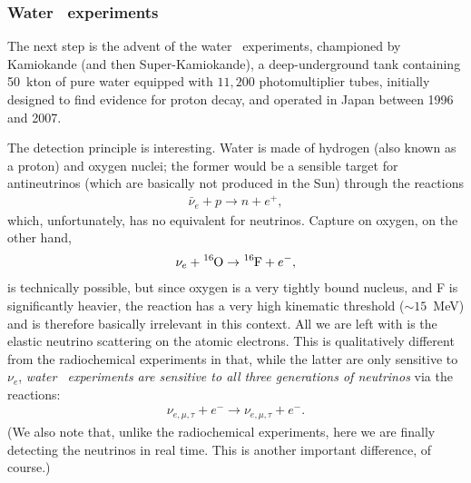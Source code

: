 \subsubsection{Water \cherenkov\ experiments}

The next step is the advent of the water \cherenkov\ experiments, championed by
Kamiokande (and then Super-Kamiokande), a deep-underground tank containing 50~kton of
pure water equipped with $11,200$ photomultiplier tubes, initially designed to find
evidence for proton decay, and operated in Japan between 1996 and 2007.

The detection principle is interesting. Water is made of hydrogen (also known as
a proton) and oxygen nuclei; the former would be a sensible target for antineutrinos
(which are basically not produced in the Sun) through the reactions
\begin{align*}
  \bar{\nu}_e + p \rightarrow n + e^+,
\end{align*}
which, unfortunately, has no equivalent for neutrinos.
Capture on oxygen, on the other hand,
\begin{align*}
  \nu_e + \ce{^{16}O} \rightarrow \ce{^{16}F} + e^-,
\end{align*}
is technically possible, but since oxygen is a very tightly bound nucleus, and F is
significantly heavier, the reaction has a very high kinematic threshold ($\sim 15$~MeV)
and is therefore basically irrelevant in this context. All we are left with is the elastic
neutrino scattering on the atomic electrons. This is qualitatively different from the radiochemical experiments
in that, while the latter are only sensitive to $\nu_e$, \emph{water \cherenkov\
experiments are sensitive to all three generations of neutrinos} via the reactions:
\begin{align*}
  \nu_{e, \mu, \tau} + e^- \rightarrow  \nu_{e, \mu, \tau} + e^-.
\end{align*}
(We also note that, unlike the radiochemical experiments, here we are finally detecting
the neutrinos in real time. This is another important difference, of course.)

